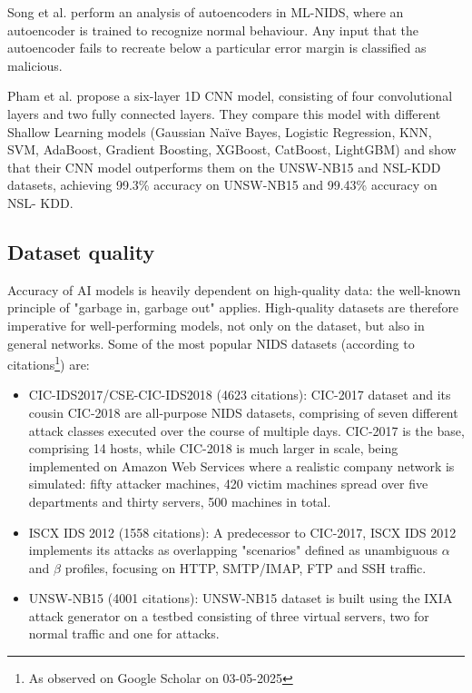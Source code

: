 Song et al. \cite{analysis_autoencoders} perform an analysis of autoencoders in ML-NIDS, where an autoencoder is trained to recognize normal behaviour. Any input that the autoencoder fails to recreate below a particular error margin is classified as malicious. 

Pham et al. \cite{nids_cnn} propose a six-layer 1D CNN model, consisting of four convolutional layers and two fully connected layers. They compare this model with different Shallow Learning models (Gaussian Naïve Bayes, Logistic Regression, KNN, SVM, AdaBoost, Gradient Boosting, XGBoost, CatBoost, LightGBM) and show that their CNN model outperforms them on the UNSW-NB15\cite{unsw-nb15} and NSL-KDD \cite{nsl-kdd} datasets, achieving 99.3\% accuracy on UNSW-NB15 and 99.43\% accuracy on NSL- KDD.
\subsection{Dataset quality}
Accuracy of AI models is heavily dependent on high-quality data: the well-known principle of "garbage in, garbage out" applies. High-quality datasets are therefore imperative for well-performing models, not only on the dataset, but also in general networks. Some of the most popular NIDS datasets (according to citations\footnote{As observed on Google Scholar on 03-05-2025}) are:
\begin{itemize}
    \item CIC-IDS2017/CSE-CIC-IDS2018 \cite{cic_2017, cic_2018} (4623 citations): CIC-2017 dataset and its cousin CIC-2018 are all-purpose NIDS datasets, comprising of seven different attack classes executed over the course of multiple days. CIC-2017 is the base, comprising 14 hosts, while CIC-2018 is much larger in scale, being implemented on Amazon Web Services where a realistic company network is simulated: fifty attacker machines, 420 victim machines spread over five departments and thirty servers, 500 machines in total. 
    \item ISCX IDS 2012 \cite{iscx_ids_2012} (1558 citations): A predecessor to CIC-2017, ISCX IDS 2012 implements its attacks as overlapping "scenarios" defined as unambiguous $\alpha$ and $\beta$ profiles, focusing on HTTP, SMTP/IMAP, FTP and SSH traffic. 
    \item UNSW-NB15 \cite{unsw-nb15} (4001 citations): UNSW-NB15 dataset is built using the IXIA attack generator on a testbed consisting of three virtual servers, two for normal traffic and one for attacks.
\end{itemize}


